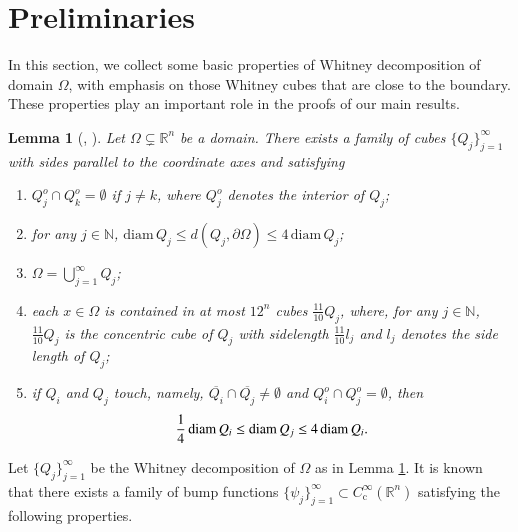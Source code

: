 \documentclass[11pt,twoside]{article}
\def\rn{{\mathbb{R}^n}}
\def\nn{{\mathbb N}}
\def\boz{{\Omega}}
\def\pa{\partial}                %
\theoremstyle{mylem}
\newtheorem{lemma}[theorem]{Lemma}
\theoremstyle{definition}
\numberwithin{equation}{section}
\begin{document}


\section{Preliminaries}\label{s2}

\hspace{1em} In this section, we collect some basic properties of Whitney decomposition of domain $\boz$, with emphasis on those Whitney cubes that are close to the boundary. These properties play an important role in the proofs of our main results.

\begin{lemma}[\cite{g2008}, \cite{s1970}]\label{lem2.1}
Let \( \boz \subsetneq \rn \) be a domain. There exists a family of cubes \( \{Q_j\}_{j=1}^{\infty} \) with sides parallel to the coordinate axes and satisfying
\begin{enumerate}
\item[\rm(i)]\( Q_j^o \cap Q_k^o = \emptyset \) if \( j \neq k \), where \( Q_j^o \) denotes the interior of \( Q_j \);
\item[\rm(ii)]for any \( j \in \nn \), \( \mathrm{diam} \, Q_j \leq d(Q_j, \pa\boz) \leq 4 \, \mathrm{diam} \, Q_j \);
\item[\rm(iii)]
\( \boz = \bigcup_{j=1}^{\infty}Q_j \);
\item[\rm(iv)]
each \( x \in \boz \) is contained in at most \( 12^n \) cubes \( \frac{11}{10}Q_j \), where, for any \(j\in\nn\), \( \frac{11}{10}Q_j \) is the concentric cube of \( Q_j \) with sidelength \( \frac{11}{10} l_j \) and $l_j$ denotes the side length of $Q_j$;
\item[\rm(v)]if \( Q_i \) and \( Q_j \) touch, namely, \( \overline{Q_i} \cap \overline{Q_j} \neq \emptyset \) and \( Q_i^o \cap Q_j^o = \emptyset \), then
\[
\frac{1}{4} \, \mathrm{diam} \, Q_i \leq \textup{diam} \, Q_j \leq 4 \, \mathrm{diam} \, Q_i.
\]
\end{enumerate}
\end{lemma}
Let \( \{Q_j\}_{j=1}^{\infty} \) be the Whitney decomposition of \( \Omega \) as in Lemma \ref{lem2.1}. It is known that there exists a family of bump functions \( \{\psi_j\}_{j=1}^{\infty} \subset C_{\mathrm{c}}^\infty(\mathbb{R}^n) \) satisfying the following properties.
\end{document}
